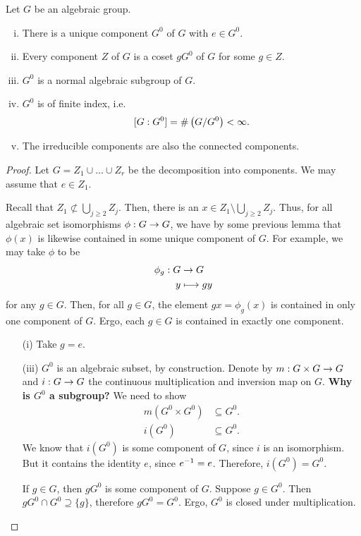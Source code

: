 \begin{theorem}
	Let $G$ be an algebraic group.
	\begin{enumerate}[(i)]
		\item There is a unique component $G^0$ of $G$ with $e \in G^0$.
		\item Every component $Z$ of $G$ is a coset $gG^0$ of $G$ for some $g\in Z$.
		\item $G^0$ is a normal algebraic subgroup of $G$.
		\item $G^0$ is of finite index, i.e.
		\[ [G: G^0] = \# \left(G / G^0\right) < \infty. \]
		\item 	The irreducible components are also the connected components.
	\end{enumerate}
\end{theorem}
\begin{proof}
Let $G = Z_1 \cup \ldots \cup Z_r$ be the decomposition into components. 
We may assume that $e \in Z_1$.

Recall that $Z_1 \not \subset \bigcup_{j \geq 2} Z_j$.
Then, there is an $x \in Z_1 \setminus \bigcup_{j \geq 2} Z_j$.
Thus, for all algebraic set isomorphisms $\phi : G \overset{}{\rightarrow} G$, we have by some previous lemma
that $ \phi (x)$ is likewise contained in some unique component of $G$.
For example, we may take $\phi$ to be 
\begin{align*}
\phi_g : G& \overset{}{\rightarrow} G\\
y &\longmapsto gy
\end{align*}
for any $g \in G$.
Then, for all $g\in G$, the element $gx = \phi_g(x)$ is contained in only one component of $G$. Ergo, each $g \in G$ is contained in exactly one component.
	\begin{enumerate}
	\item[(i)] Take $g = e$.
	\item[(iii)] $G^0$ is an algebraic subset, by construction. Denote by $m : G \times G \overset{}{\rightarrow} G$ and $i : G \overset{}{\rightarrow} G$ the continuous multiplication and inversion map on $G$.
	\textbf{Why is $G^0$ a subgroup?} We need to show
	\begin{align*}
	 m(G^0 \times G^0) &\subseteq G^0.\\
	i(G^0) &\subseteq G^0. 
	\end{align*}
	We know that $i(G^0)$ is some component of $G$, since $i$ is an isomorphism. But it contains the identity $e$, since $e^{-1} = e$. Therefore, $i(G^0) = G^0$.
	
	If $g \in G$, then $gG^0$ is some component of $G$. Suppose $g \in G^0$. Then $gG^0 \cap G^0 \supseteq \{g\}$, therefore $gG^0 = G^0$. Ergo, $G^0$ is closed under multiplication.
	

\end{enumerate}
\end{proof}
